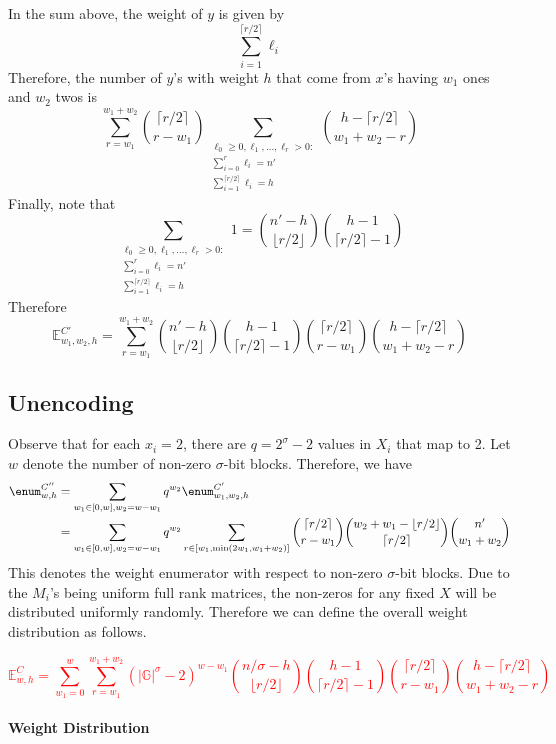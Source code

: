 In the sum above, the weight of $y$ is given by
$$\sum_{i=1}^{\lceil r/2 \rceil}\ell_i$$
Therefore, the number of $y$'s with weight $h$ that come from $x$'s having $w_1$ ones and $w_2$ twos is
$$\sum_{r = w_1}^{w_1 + w_2}\binom{\lceil r/2 \rceil}{r - w_1}\sum_{\substack{\ell_0 \ge 0, \ell_1, \ldots, \ell_r > 0:\\\sum_{i = 0}^r\ell_i = n'\\\sum_{i=1}^{\lceil r/2 \rceil}\ell_i = h}}\binom{h - \lceil r/2 \rceil}{w_1 + w_2 - r}$$
Finally, note that
$$\sum_{\substack{\ell_0 \ge 0, \ell_1, \ldots, \ell_r > 0:\\\sum_{i = 0}^r\ell_i = n'\\\sum_{i=1}^{\lceil r/2 \rceil}\ell_i = h}}1 = \binom{n' - h}{\lfloor r/2 \rfloor}\binom{h - 1}{\lceil r/2 \rceil - 1}$$
Therefore
$$\mathbb{E}_{w_1, w_2, h}^{C'} = \sum_{r = w_1}^{w_1 + w_2}\binom{n' - h}{\lfloor r/2 \rfloor}\binom{h - 1}{\lceil r/2 \rceil - 1}\binom{\lceil r/2 \rceil}{r - w_1}\binom{h - \lceil r/2 \rceil}{w_1 + w_2 - r}$$

\subsection{Unencoding}
Observe that for each $x_i=2$, there are $q=2^\sigma-2$ values in $X_i$ that map to 2. Let $w$ denote the number of non-zero $\sigma$-bit blocks. Therefore, we have 
\begin{align*}
\enum^{C''}_{w,h} &= \sum_{w_1\in [0,w],w_2=w-w_1} q^{w_2}\enum^{C'}_{w_1,w_2,h}\\
&= \sum_{w_1\in [0,w],w_2=w-w_1} q^{w_2} \sum_{r\in [w_1,\min(2w_1,w_1+w_2)]}   {\lceil r/2\rceil \choose r-w_1} {w_2+w_1-\lfloor r/2\rfloor \choose \lceil r/2\rceil} {n' \choose w_1+w_2} 
\end{align*}
This denotes the weight enumerator with respect to non-zero $\sigma$-bit blocks. Due to the $M_i$'s being uniform full rank matrices, the non-zeros for any fixed $X$ will be distributed uniformly randomly. Therefore we can define the overall weight distribution as follows.

\textcolor{red}{$$\mathbb{E}_{w, h}^{C} = \sum_{w_1 = 0}^{w}\sum_{r = w_1}^{w_1 + w_2}(|\mathbb{G}|^{\sigma} - 2)^{w - w_1}\binom{n/\sigma - h}{\lfloor r/2 \rfloor}\binom{h - 1}{\lceil r/2 \rceil - 1}\binom{\lceil r/2 \rceil}{r - w_1}\binom{h - \lceil r/2 \rceil}{w_1 + w_2 - r}$$}

\paragraph{Weight Distribution}


